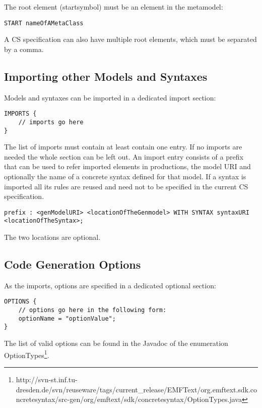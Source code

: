 The root element (startsymbol) must be an element in the metamodel:

\begin{lstlisting}
START nameOfAMetaClass
\end{lstlisting}

A CS specification can also have multiple root elements, which must be separated by a comma.

\subsection{Importing other Models and Syntaxes}

Models and syntaxes can be imported in a dedicated import section:

\begin{lstlisting}
IMPORTS {
    // imports go here
}
\end{lstlisting}

The list of imports must contain at least contain one entry. If no imports are needed the whole section can be left out. An import entry consists of a prefix that can be used to refer imported elements in productions, the model URI and optionally the name of a concrete syntax defined for that model. If a syntax is imported all its rules are reused and need not to be specified in the current CS specification.
 
\begin{lstlisting}
prefix : <genModelURI> <locationOfTheGenmodel> WITH SYNTAX syntaxURI <locationOfTheSyntax>;
\end{lstlisting}

The two locations are optional.

\subsection{Code Generation Options}

As the imports, options are specified in a dedicated optional section:

\begin{lstlisting}
OPTIONS {
    // options go here in the following form:
    optionName = "optionValue";
}
\end{lstlisting}

The list of valid options can be found in the Javadoc of the enumeration
OptionTypes\footnote{http://svn-st.inf.tu-dresden.de/svn/reuseware/tags/current\_release/EMFText/org.emftext.sdk.concretesyntax/src-gen/org/emftext/sdk/concretesyntax/OptionTypes.java}.

